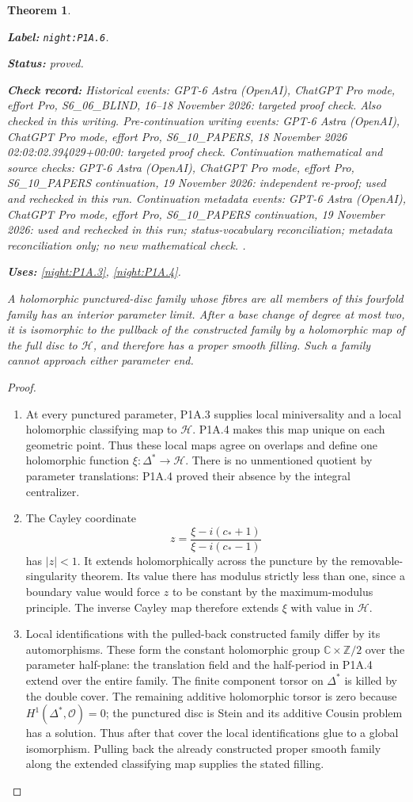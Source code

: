 \documentclass[11pt,a4paper]{article}
\newtheorem{theorem}{Theorem}[section]
\theoremstyle{definition}
\newcommand{\StatementRecord}[4]{\par\smallskip\begingroup\upshape\raggedright\noindent\textbf{Label:} \nolinkurl{#1}.\par\noindent\textbf{Status:} #2.\par\noindent\textbf{Check record:} #3.\par\noindent\textbf{Uses:} #4.\par\endgroup\smallskip}
\begin{document}
\begin{theorem}\label{night:P1A.6}
\StatementRecord{night:P1A.6}{proved}{Historical events: GPT-6 Astra (OpenAI), ChatGPT Pro mode, effort Pro, S6\_06\_BLIND, 16--18 November 2026: targeted proof check. Also checked in this writing. Pre-continuation writing events: GPT-6 Astra (OpenAI), ChatGPT Pro mode, effort Pro, S6\_10\_PAPERS, 18 November 2026 02:02:02.394029+00:00: targeted proof check. Continuation mathematical and source checks: GPT-6 Astra (OpenAI), ChatGPT Pro mode, effort Pro, S6\_10\_PAPERS continuation, 19 November 2026: independent re-proof; used and rechecked in this run. Continuation metadata events: GPT-6 Astra (OpenAI), ChatGPT Pro mode, effort Pro, S6\_10\_PAPERS continuation, 19 November 2026: used and rechecked in this run; status-vocabulary reconciliation; metadata reconciliation only; no new mathematical check. }{\cref{night:P1A.3}, \cref{night:P1A.4}}
A holomorphic punctured-disc family whose fibres are all
members of this fourfold family has an interior parameter
limit. After a base change of degree at most two, it is
isomorphic to the pullback of the constructed family by
a holomorphic map of the full disc to $\mathcal H$, and
therefore has a proper smooth filling. Such a family
cannot approach either parameter end.
\end{theorem}
\begin{proof}
\begin{enumerate}[label=\arabic*.]
\item At every punctured parameter, P1A.3 supplies local
miniversality and a local holomorphic classifying map to
$\mathcal H$. P1A.4 makes this map unique on each geometric
point. Thus these local maps agree on overlaps and define
one holomorphic function $\xi:\Delta^*\to\mathcal H$.
There is no unmentioned quotient by parameter translations:
P1A.4 proved their absence by the integral centralizer.

\item The Cayley coordinate
\[
 z=\frac{\xi-i(c_*+1)}{\xi-i(c_*-1)}
\]
has $|z|<1$. It extends holomorphically across the puncture
by the removable-singularity theorem. Its value there has
modulus strictly less than one, since a boundary value
would force $z$ to be constant by the maximum-modulus
principle. The inverse Cayley map therefore extends
$\xi$ with value in $\mathcal H$.

\item Local identifications with the pulled-back constructed
family differ by its automorphisms. These form the constant
holomorphic group $\mathbb C\times\mathbb Z/2$ over the
parameter half-plane: the translation field and the
half-period in P1A.4 extend over the entire family.
The finite component torsor on $\Delta^*$ is killed by
the double cover. The remaining additive holomorphic
torsor is zero because $H^1(\Delta^*,\mathcal O)=0$;
the punctured disc is Stein and its additive Cousin
problem has a solution. Thus after that cover the local
identifications glue to a global isomorphism. Pulling
back the already constructed proper smooth family along
the extended classifying map supplies the stated filling.

\end{enumerate}
\end{proof}
\end{document}
